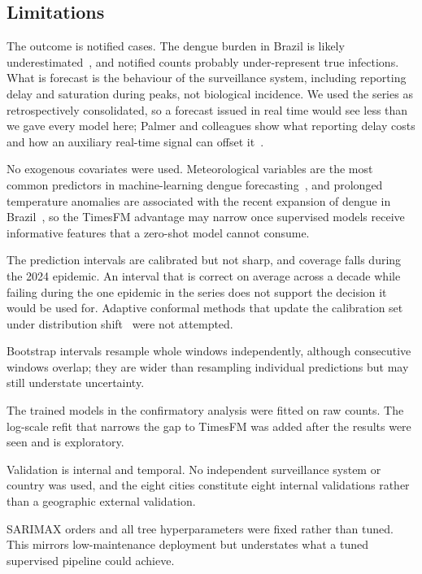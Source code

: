 \documentclass[10pt,letterpaper]{article}
\begin{document}
{\subsection*{Limitations}

The outcome is notified cases. The dengue burden in Brazil is likely underestimated~\cite{Siqueira2022}, and notified counts probably under-represent true infections. What is forecast is the behaviour of the surveillance system, including reporting delay and saturation during peaks, not biological incidence. We used the series as retrospectively consolidated, so a forecast issued in real time would see less than we gave every model here; Palmer and colleagues show what reporting delay costs and how an auxiliary real-time signal can offset it~\cite{Palmer2026hosp}.

No exogenous covariates were used. Meteorological variables are the most common predictors in machine-learning dengue forecasting~\cite{Fang2024}, and prolonged temperature anomalies are associated with the recent expansion of dengue in Brazil~\cite{Barcellos2024}, so the TimesFM advantage may narrow once supervised models receive informative features that a zero-shot model cannot consume.

The prediction intervals are calibrated but not sharp, and coverage falls during the 2024 epidemic. An interval that is correct on average across a decade while failing during the one epidemic in the series does not support the decision it would be used for. Adaptive conformal methods that update the calibration set under distribution shift~\cite{Gibbs2021adaptive} were not attempted.

Bootstrap intervals resample whole windows independently, although consecutive windows overlap; they are wider than resampling individual predictions but may still understate uncertainty.

The trained models in the confirmatory analysis were fitted on raw counts. The log-scale refit that narrows the gap to TimesFM was added after the results were seen and is exploratory.

Validation is internal and temporal. No independent surveillance system or country was used, and the eight cities constitute eight internal validations rather than a geographic external validation.

SARIMAX orders and all tree hyperparameters were fixed rather than tuned. This mirrors low-maintenance deployment but understates what a tuned supervised pipeline could achieve.

}
\end{document}
